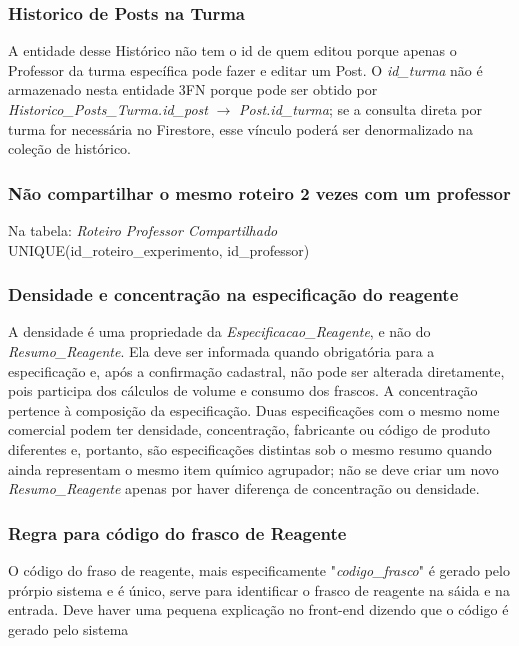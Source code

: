 \documentclass[12pt,a4paper]{article}
\begin{document}
\subsubsection{Historico de Posts na Turma}
\begin{regra}
A entidade desse Histórico não tem o id de quem editou porque apenas o Professor da turma específica pode fazer e editar um Post. O \textit{id\_turma} não é armazenado nesta entidade 3FN porque pode ser obtido por \textit{Historico\_Posts\_Turma.id\_post} $\rightarrow$ \textit{Post.id\_turma}; se a consulta direta por turma for necessária no Firestore, esse vínculo poderá ser denormalizado na coleção de histórico. 
\end{regra}
\subsubsection{Não compartilhar o mesmo roteiro 2 vezes com um professor}
\begin{regra}
Na tabela: \textit{Roteiro Professor Compartilhado} \\
UNIQUE(id\_roteiro\_experimento, id\_professor)
\end{regra}
\subsubsection{Densidade e concentração na especificação do reagente}
\begin{regra}
A densidade é uma propriedade da \textit{Especificacao\_Reagente}, e não do \textit{Resumo\_Reagente}. Ela deve ser informada quando obrigatória para a especificação e, após a confirmação cadastral, não pode ser alterada diretamente, pois participa dos cálculos de volume e consumo dos frascos. A concentração pertence à composição da especificação. Duas especificações com o mesmo nome comercial podem ter densidade, concentração, fabricante ou código de produto diferentes e, portanto, são especificações distintas sob o mesmo resumo quando ainda representam o mesmo item químico agrupador; não se deve criar um novo \textit{Resumo\_Reagente} apenas por haver diferença de concentração ou densidade. 
\end{regra}
\subsubsection{Regra para código do frasco de Reagente}
\begin{regra}
O código do fraso de reagente, mais especificamente "\textit{codigo\_frasco}" é gerado pelo prórpio sistema e é único, serve para identificar o frasco de reagente na sáida e na entrada. Deve haver uma pequena explicação no front-end dizendo que o código é gerado pelo sistema
\end{regra}
\end{document}
